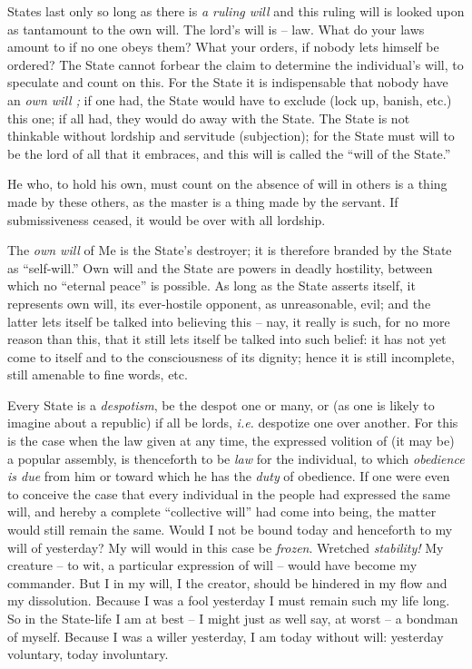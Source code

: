 States last only so long as there is \textit{a ruling will} and this ruling 
will is looked upon as tantamount to the own will. The lord's will is -- law. 
What do your laws amount to if no one obeys them? What your orders, if nobody 
lets himself be ordered? The State cannot forbear the claim to determine the 
individual's will, to speculate and count on this. For the State it is 
indispensable that nobody have an \textit{own will ;} if one had, the State 
would have to exclude (lock up, banish, etc.) this one; if all had, they would 
do away with the State. The State is not thinkable without lordship and 
servitude (subjection); for the State must will to be the lord of all that it 
embraces, and this will is called the ``will of the State.''

He who, to hold his own, must count on the absence of will in others is a 
thing made by these others, as the master is a thing made by the servant. If 
submissiveness ceased, it would be over with all lordship.

The \textit{own will} of Me is the State's destroyer; it is therefore branded 
by the State as ``self-will.'' Own will and the State are powers in deadly 
hostility, between which no ``eternal peace'' is possible. As long as the 
State asserts itself, it represents own will, its ever-hostile opponent, as 
unreasonable, evil; and the latter lets itself be talked into believing this  -- nay, it really is such, for no more reason than this, that it still lets 
itself be talked into such belief: it has not yet come to itself and to the 
consciousness of its dignity; hence it is still incomplete, still amenable to 
fine words, etc.

Every State is a \textit{despotism}, be the despot one or many, or (as one is 
likely to imagine about a republic) if all be lords, \textit{i.e.} despotize 
one over another. For this is the case when the law given at any time, the 
expressed volition of (it may be) a popular assembly, is thenceforth to be 
\textit{law} for the individual, to which \textit{obedience is due} from him 
or toward which he has the \textit{duty} of obedience. If one were even to 
conceive the case that every individual in the people had expressed the same 
will, and hereby a complete ``collective will'' had come into being, the 
matter would still remain the same. Would I not be bound today and henceforth 
to my will of yesterday? My will would in this case be \textit{frozen}. 
Wretched \textit{stability!} My creature -- to wit, a particular expression of 
will -- would have become my commander. But I in my will, I the creator, 
should be hindered in my flow and my dissolution. Because I was a fool 
yesterday I must remain such my life long. So in the State-life I am at best  -- I might just as well say, at worst -- a bondman of myself. Because I was a 
willer yesterday, I am today without will: yesterday voluntary, today 
involuntary.

